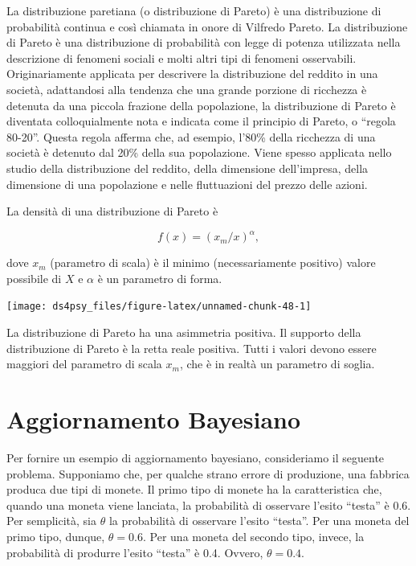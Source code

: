 \documentclass[
  11pt,
]{krantz}
\theoremstyle{definition}
\theoremstyle{definition}
\theoremstyle{definition}
\theoremstyle{definition}
\theoremstyle{remark}
\begin{document}
La distribuzione paretiana (o distribuzione di Pareto) è una distribuzione di probabilità continua e così chiamata in onore di Vilfredo Pareto. La distribuzione di Pareto è una distribuzione di probabilità con legge di potenza utilizzata nella descrizione di fenomeni sociali e molti altri tipi di fenomeni osservabili. Originariamente applicata per descrivere la distribuzione del reddito in una società, adattandosi alla tendenza che una grande porzione di ricchezza è detenuta da una piccola frazione della popolazione, la distribuzione di Pareto è diventata colloquialmente nota e indicata come il principio di Pareto, o ``regola 80-20''. Questa regola afferma che, ad esempio, l'80\% della ricchezza di una società è detenuto dal 20\% della sua popolazione. Viene spesso applicata nello studio della distribuzione del reddito, della dimensione dell'impresa, della dimensione di una popolazione e nelle fluttuazioni del prezzo delle azioni.

La densità di una distribuzione di Pareto è

\[
f(x)=(x_m/x)^\alpha,
\]

dove \(x_m\) (parametro di scala) è il minimo (necessariamente positivo) valore possibile di \(X\) e \(\alpha\) è un parametro di forma.

\begin{center}\texttt{[image: ds4psy\_files/figure-latex/unnamed-chunk-48-1]} \end{center}

\noindent La distribuzione di Pareto ha una asimmetria positiva. Il supporto della distribuzione di Pareto è la retta reale positiva. Tutti i valori devono essere maggiori del parametro di scala \(x_m\), che è in realtà un parametro di soglia.

\hypertarget{appendix:bayes-updating}{%
\chapter{Aggiornamento Bayesiano}\label{appendix:bayes-updating}}

Per fornire un esempio di aggiornamento bayesiano, consideriamo il seguente problema. Supponiamo che, per qualche strano errore di produzione, una fabbrica produca due tipi di monete. Il primo tipo di monete ha la caratteristica che, quando una moneta viene lanciata, la probabilità di osservare l'esito ``testa'' è 0.6. Per semplicità, sia \(\theta\) la probabilità di osservare l'esito ``testa''. Per una moneta del primo tipo, dunque, \(\theta = 0.6\). Per una moneta del secondo tipo, invece, la probabilità di produrre l'esito ``testa'' è 0.4. Ovvero, \(\theta = 0.4\).
\end{document}
